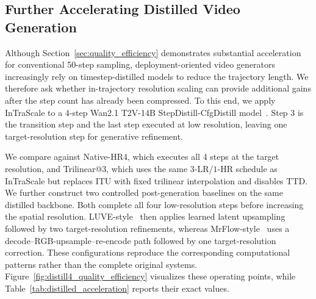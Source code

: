\documentclass[letterpaper]{article} %
\begin{document}
\subsection{Further Accelerating Distilled Video Generation}
\label{sec:distilled_acceleration}

Although Section~\ref{sec:quality_efficiency} demonstrates substantial
acceleration for conventional 50-step sampling, deployment-oriented
video generators increasingly rely on timestep-distilled models to reduce the
trajectory length. We therefore ask whether in-trajectory resolution scaling
can provide additional gains after the step count has already been
compressed. To this end, we apply InTraScale to a 4-step Wan2.1
T2V-14B StepDistill-CfgDistill model~\citep{lightx2v2025}. Step 3 is the transition step
and the last step executed at low resolution, leaving one
target-resolution step for generative refinement.

We compare against Native-HR4, which executes all 4 steps at the
target resolution, and Trilinear@3, which uses the same
\(3\)-LR/\(1\)-HR schedule as InTraScale but replaces ITU with fixed
trilinear interpolation and disables TTD. We further construct two controlled
post-generation baselines on the same distilled backbone. Both complete all
four low-resolution steps before increasing the spatial resolution.
LUVE-style~\citep{zhao2026luve} then applies learned latent upsampling followed
by two target-resolution refinements, whereas
MrFlow-style~\citep{zheng2026mrflow} uses a
decode--RGB-upsample--re-encode path followed by one target-resolution
correction. These configurations reproduce the corresponding computational
patterns rather than the complete original systems.
Figure~\ref{fig:distill4_quality_efficiency} visualizes these operating points,
while Table~\ref{tab:distilled_acceleration} reports their exact values.
\end{document}
